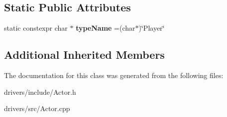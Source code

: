 \subsection*{Static Public Attributes}
\begin{DoxyCompactItemize}
\item 
\hypertarget{classPlayer_a0b125b1e2117688adffc2e89db2fb53a}{}static constexpr char $\ast$ {\bfseries type\+Name} =(char$\ast$)\char`\"{}Player\char`\"{}\label{classPlayer_a0b125b1e2117688adffc2e89db2fb53a}

\end{DoxyCompactItemize}
\subsection*{Additional Inherited Members}


The documentation for this class was generated from the following files\+:\begin{DoxyCompactItemize}
\item 
drivers/include/Actor.\+h\item 
drivers/src/Actor.\+cpp\end{DoxyCompactItemize}
